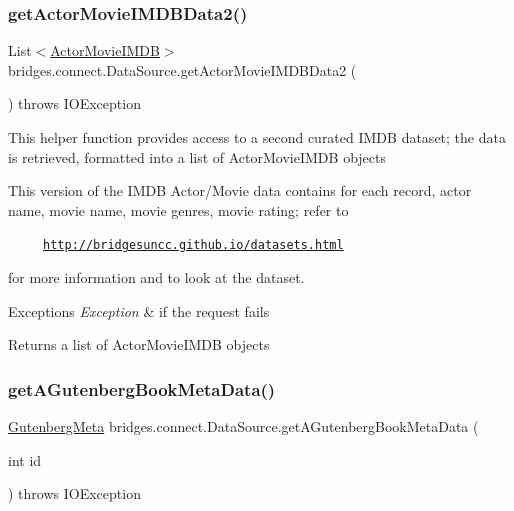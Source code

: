 \subsubsection{\texorpdfstring{get\+Actor\+Movie\+I\+M\+D\+B\+Data2()}{getActorMovieIMDBData2()}}
{\footnotesize\ttfamily List$<$\hyperlink{classbridges_1_1data__src__dependent_1_1_actor_movie_i_m_d_b}{Actor\+Movie\+I\+M\+DB}$>$ bridges.\+connect.\+Data\+Source.\+get\+Actor\+Movie\+I\+M\+D\+B\+Data2 (\begin{DoxyParamCaption}{ }\end{DoxyParamCaption}) throws I\+O\+Exception}

This helper function provides access to a second curated I\+M\+DB dataset; the data is retrieved, formatted into a list of Actor\+Movie\+I\+M\+DB objects

This version of the I\+M\+DB Actor/\+Movie data contains for each record, actor name, movie name, movie genres, movie rating; refer to 

~~~~~\href{http://bridgesuncc.github.io/datasets.html}{\tt http\+://bridgesuncc.\+github.\+io/datasets.\+html} 

for more information and to look at the dataset.


\begin{DoxyExceptions}{Exceptions}
{\em Exception} & if the request fails\\
\hline
\end{DoxyExceptions}
\begin{DoxyReturn}{Returns}
a list of Actor\+Movie\+I\+M\+DB objects 
\end{DoxyReturn}
\mbox{\label{classbridges_1_1connect_1_1_data_source_a1f0ec9eb03a7e3631146415c317a1694}} 
\subsubsection{\texorpdfstring{get\+A\+Gutenberg\+Book\+Meta\+Data()}{getAGutenbergBookMetaData()}}
{\footnotesize\ttfamily \hyperlink{classbridges_1_1data__src__dependent_1_1_gutenberg_meta}{Gutenberg\+Meta} bridges.\+connect.\+Data\+Source.\+get\+A\+Gutenberg\+Book\+Meta\+Data (\begin{DoxyParamCaption}\item[{int}]{id }\end{DoxyParamCaption}) throws I\+O\+Exception}

